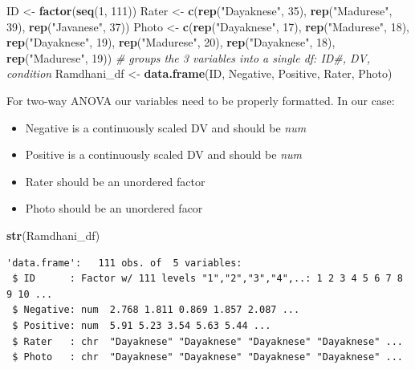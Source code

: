 \documentclass[
  11pt,
]{book}
\newenvironment{Shaded}{\begin{snugshade}}{\end{snugshade}}
\newcommand{\CommentTok}[1]{\textcolor[rgb]{0.37,0.37,0.37}{\textit{#1}}}
\newcommand{\DecValTok}[1]{\textcolor[rgb]{0.06,0.06,0.06}{#1}}
\newcommand{\FunctionTok}[1]{\textcolor[rgb]{0.27,0.27,0.27}{\textbf{#1}}}
\newcommand{\NormalTok}[1]{#1}
\newcommand{\OtherTok}[1]{\textcolor[rgb]{0.37,0.37,0.37}{#1}}
\newcommand{\StringTok}[1]{\textcolor[rgb]{0.5,0.5,0.5}{#1}}
\providecommand{\tightlist}{%
  \setlength{\itemsep}{0pt}\setlength{\parskip}{0pt}}
\begin{document}
\begin{Shaded}
\begin{Highlighting}[]
\NormalTok{ID }\OtherTok{\textless{}{-}} \FunctionTok{factor}\NormalTok{(}\FunctionTok{seq}\NormalTok{(}\DecValTok{1}\NormalTok{, }\DecValTok{111}\NormalTok{))}
\NormalTok{Rater }\OtherTok{\textless{}{-}} \FunctionTok{c}\NormalTok{(}\FunctionTok{rep}\NormalTok{(}\StringTok{"Dayaknese"}\NormalTok{, }\DecValTok{35}\NormalTok{), }\FunctionTok{rep}\NormalTok{(}\StringTok{"Madurese"}\NormalTok{, }\DecValTok{39}\NormalTok{), }\FunctionTok{rep}\NormalTok{(}\StringTok{"Javanese"}\NormalTok{, }\DecValTok{37}\NormalTok{))}
\NormalTok{Photo }\OtherTok{\textless{}{-}} \FunctionTok{c}\NormalTok{(}\FunctionTok{rep}\NormalTok{(}\StringTok{"Dayaknese"}\NormalTok{, }\DecValTok{17}\NormalTok{), }\FunctionTok{rep}\NormalTok{(}\StringTok{"Madurese"}\NormalTok{, }\DecValTok{18}\NormalTok{), }\FunctionTok{rep}\NormalTok{(}\StringTok{"Dayaknese"}\NormalTok{,}
    \DecValTok{19}\NormalTok{), }\FunctionTok{rep}\NormalTok{(}\StringTok{"Madurese"}\NormalTok{, }\DecValTok{20}\NormalTok{), }\FunctionTok{rep}\NormalTok{(}\StringTok{"Dayaknese"}\NormalTok{, }\DecValTok{18}\NormalTok{), }\FunctionTok{rep}\NormalTok{(}\StringTok{"Madurese"}\NormalTok{, }\DecValTok{19}\NormalTok{))}
\CommentTok{\# groups the 3 variables into a single df: ID\#, DV, condition}
\NormalTok{Ramdhani\_df }\OtherTok{\textless{}{-}} \FunctionTok{data.frame}\NormalTok{(ID, Negative, Positive, Rater, Photo)}
\end{Highlighting}
\end{Shaded}

For two-way ANOVA our variables need to be properly formatted. In our case:

\begin{itemize}
\tightlist
\item
  Negative is a continuously scaled DV and should be \emph{num}
\item
  Positive is a continuously scaled DV and should be \emph{num}
\item
  Rater should be an unordered factor
\item
  Photo should be an unordered facor
\end{itemize}

\begin{Shaded}
\begin{Highlighting}[]
\FunctionTok{str}\NormalTok{(Ramdhani\_df)}
\end{Highlighting}
\end{Shaded}

\begin{verbatim}
'data.frame':   111 obs. of  5 variables:
 $ ID      : Factor w/ 111 levels "1","2","3","4",..: 1 2 3 4 5 6 7 8 9 10 ...
 $ Negative: num  2.768 1.811 0.869 1.857 2.087 ...
 $ Positive: num  5.91 5.23 3.54 5.63 5.44 ...
 $ Rater   : chr  "Dayaknese" "Dayaknese" "Dayaknese" "Dayaknese" ...
 $ Photo   : chr  "Dayaknese" "Dayaknese" "Dayaknese" "Dayaknese" ...
\end{verbatim}
\end{document}
